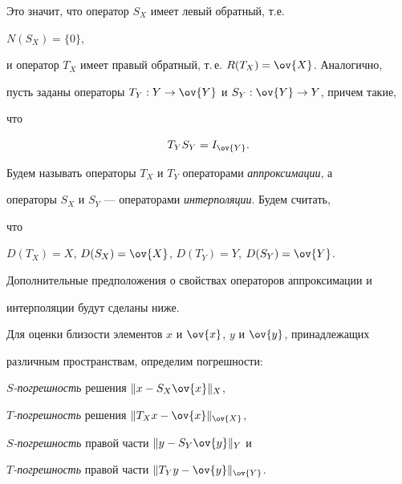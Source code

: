 Это значит, что оператор $S_X$ имеет левый обратный, т.е.


$N(S_X)=\{0\}$,


и оператор $T_X$ имеет правый обратный, т.\,е. $R(T_X)=\ov{X}$. Аналогично,


пусть заданы операторы $T_Y: Y\to\ov{Y}$ и $S_Y: \ov{Y}\to Y$, причем такие,


что


\begin{equation}


T_Y S_Y = I_{\ov{Y}}.


\end{equation}


Будем называть операторы $T_X$ и $T_Y$ операторами {\em аппроксимации}, а


операторы $S_X$ и $S_Y$ --- операторами {\em интерполяции}. Будем считать,


что


$D(T_X) = X$, $D(S_X) = \ov{X}$, $D(T_Y) = Y$, $D(S_Y) = \ov{Y}$.


Дополнительные предположения о свойствах операторов аппроксимации и


интерполяции будут сделаны ниже.





Для оценки близости элементов $x$ и $\ov{x}$, $y$ и $\ov{y}$, принадлежащих


различным пространствам, определим погрешности:


$S${\em -погрешность} решения $\nr{x-S_X\ov{x}}_X$,


$T${\em -погрешность} решения $\nr{T_Xx-\ov{x}}_{\ov{X}}$,


$S${\em -погрешность} правой части $\nr{y-S_Y\ov{y}}_Y$ и


$T${\em -погрешность} правой части $\nr{T_Yy-\ov{y}}_{\ov{Y}}$.





